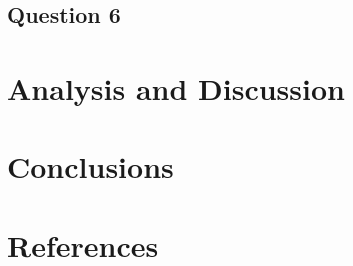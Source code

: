 \documentclass{article}
\begin{document}
\subsection{Question 6}


\section{Analysis and Discussion}

\newpage
\section{Conclusions}

\newpage
\section{References}
\printbibliography[heading=none]
\end{document}
